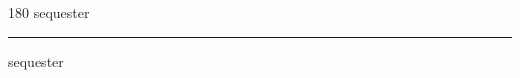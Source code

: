 
\begin{frame}
\begin{center}
\begin{turn}{180}
{\fontsize{2.5cm}{1em}\selectfont sequester}
\end{turn}
\vspace{1em}\par  
\hrule
\vspace{1em}\par  
{\fontsize{2.5cm}{1em}\selectfont sequester}
\end{center}
\end{frame}
